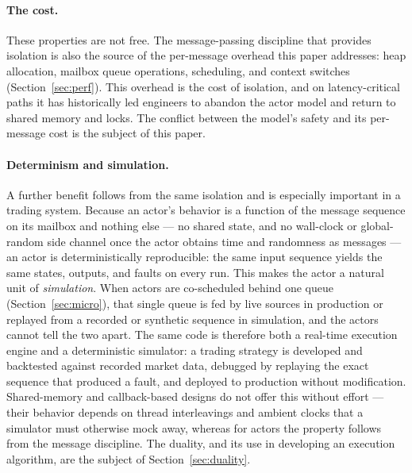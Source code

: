 \documentclass[11pt]{article}
\begin{document}
\paragraph{The cost.} These properties are not free. The message-passing
discipline that provides isolation is
also the source of the per-message overhead this paper addresses:
heap allocation, mailbox queue operations, scheduling, and context switches
(Section~\ref{sec:perf}). This overhead is the cost of isolation, and on
latency-critical paths it has historically led engineers to abandon the actor
model and return to shared memory and locks. The conflict between the model's
safety and its per-message cost is the subject of this paper.

\paragraph{Determinism and simulation.} A further benefit follows from the same
isolation and is especially important in a trading system. Because an actor's behavior
is a function of the message sequence on its mailbox and nothing else --- no
shared state, and no wall-clock or global-random side channel once the actor
obtains time and randomness as messages --- an actor is deterministically
reproducible: the same input sequence yields the same states, outputs, and faults
on every run. This makes the actor a natural unit of \emph{simulation}. When
actors are co-scheduled behind one queue (Section~\ref{sec:micro}), that single
queue is fed by live sources in production or replayed from a recorded or
synthetic sequence in simulation, and the actors cannot tell the two apart. The
same code is therefore both a real-time execution engine and a deterministic
simulator: a trading strategy is developed and backtested against recorded market
data, debugged by replaying the exact sequence that produced a fault, and
deployed to production without modification. Shared-memory and callback-based
designs do not offer this without effort --- their behavior depends on thread
interleavings and ambient clocks that a simulator must otherwise mock away,
whereas for actors the property follows from the message discipline. The duality,
and its use in developing an execution algorithm, are the subject of
Section~\ref{sec:duality}.
\end{document}
